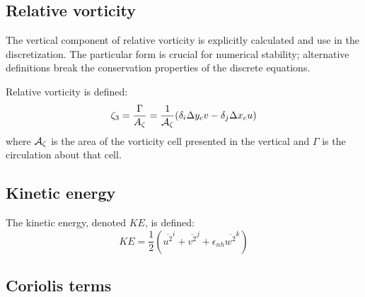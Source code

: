 
\subsection{Relative vorticity}

The vertical component of relative vorticity is explicitly calculated
and use in the discretization. The particular form is crucial for
numerical stability; alternative definitions break the conservation
properties of the discrete equations.

Relative vorticity is defined:
\begin{equation}
\zeta_3 = \frac{\Gamma}{A_\zeta}
= \frac{1}{{\cal A}_\zeta} ( \delta_i \Delta y_c v - \delta_j \Delta x_c u )
\end{equation}
where ${\cal A}_\zeta$ is the area of the vorticity cell presented in
the vertical and $\Gamma$ is the circulation about that cell.



\subsection{Kinetic energy}

The kinetic energy, denoted $KE$, is defined:
\begin{equation}
KE = \frac{1}{2} ( \overline{ u^2 }^i + \overline{ v^2 }^j 
+ \epsilon_{nh} \overline{ w^2 }^k )
\end{equation}



\subsection{Coriolis terms}

